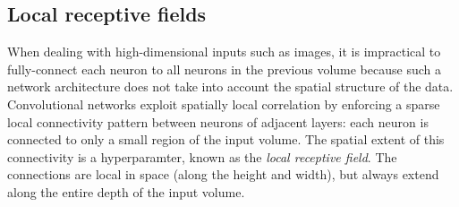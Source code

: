 \documentclass[../main.tex]{subfiles}
\begin{document}
\subsection{Local receptive fields}
When dealing with high-dimensional inputs such as images, it is impractical to fully-connect each neuron to all neurons
in the previous volume because such a network architecture does not take into account the spatial structure of the
data.
%
Convolutional networks exploit spatially local correlation by enforcing a sparse local connectivity pattern between
neurons of adjacent layers: each neuron is connected to only a small region of the input volume.
%
The spatial extent of this connectivity is a hyperparamter, known as the \emph{local receptive field}.
%
The connections are local in space (along the height and width), but always extend along the entire depth of the input
volume.
\end{document}
